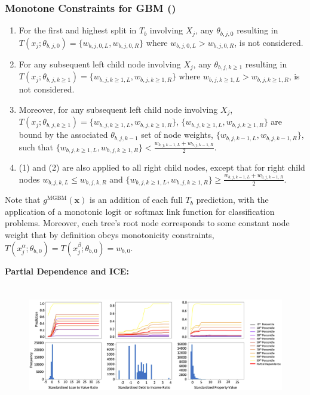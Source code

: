 \documentclass[11pt,aspectratio=169,hyperref={colorlinks}]{beamer}
\begin{document}
	\begin{frame}
	
	\frametitle{Monotone Constraints for GBM (\cite{rml_workflow})}
	
		\begin{enumerate}\scriptsize
			\item For the first and highest split in $T_b$ involving $X_j$, any $\theta_{b,j,0}$ resulting in $T(x_j; \theta_{b,j,0}) = \{w_{b,j,0,L}, w_{b,j,0,R}\}$ where $w_{b,j,0,L} > w_{b,j,0,R}$, is not considered. 
			\item For any subsequent left child node involving $X_j$, any $\theta_{b,j, k\ge1}$ resulting in $T(x_j; \theta_{b,j,k\ge1}) = \{w_{b,j,k\ge1,L}, w_{b,j,k\ge1,R}\}$ where $w_{b,j,k\ge1,L} > w_{b,j,k\ge1,R}$, is not considered.
			\item Moreover, for any subsequent left child node involving $X_j$, $T(x_j; \theta_{b,j,k\ge1}) = \{w_{b,j,k\ge1,L}, w_{b,j,k\ge1,R}\}$, $\{w_{b,j,k\ge1,L}, w_{b,j,k\ge1,R}\}$ are bound by the associated $\theta_{b,j,k-1}$ set of node weights, $\{w_{b,j,k-1,L}, w_{b,j,k-1, R}\}$, such that $ \{w_{b,j,k\ge1,L}, w_{b,j,k\ge1,R}\} < \frac{w_{b,j,k-1,L} + w_{b,j,k-1,R}}{2}$.
			\item (1) and (2) are also applied to all right child nodes, except that for right child nodes $ w_{b,j,k,L} \le w_{b,j,k,R}$ and $\{w_{b,j,k\ge1,L}, w_{b,j,k\ge1,R}\} \ge \frac{w_{b,j,k-1,L} + w_{b,j,k-1,R}}{2}$.
		\end{enumerate}
	
	Note that $g^{\text{MGBM}}(\mathbf{x})$ is an addition of each full $T_b$ prediction, with the application of a monotonic logit or softmax link function for classification problems. Moreover, each tree's root node corresponds to some constant node weight that by definition obeys monotonicity constraints, $ T(x^{\alpha}_j; \theta_{b,0}) = T(x^{\beta}_j; \theta_{b,0}) = w_{b,0}$. 
	
	\end{frame}

	\begin{frame}
	
			\textbf{Partial Dependence and ICE:}

			\begin{figure}[htb]
				\begin{center}
					\includegraphics[height=150pt]{../img/mort_mgbm_glob_pdp_ice.png}
					\label{fig:mgbm}
				\end{center}
			\end{figure}
	
	\end{frame}
\end{document}
